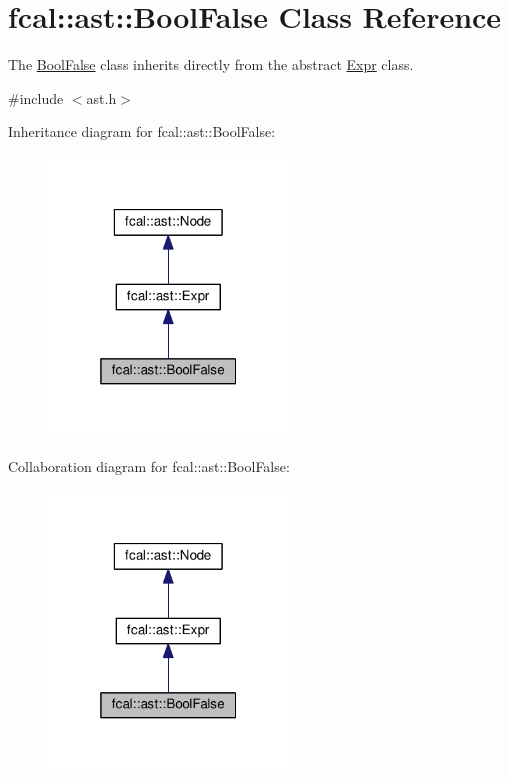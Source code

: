 \hypertarget{classfcal_1_1ast_1_1BoolFalse}{}\section{fcal\+:\+:ast\+:\+:Bool\+False Class Reference}
\label{classfcal_1_1ast_1_1BoolFalse}


The \hyperlink{classfcal_1_1ast_1_1BoolFalse}{Bool\+False} class inherits directly from the abstract \hyperlink{classfcal_1_1ast_1_1Expr}{Expr} class.  




{\ttfamily \#include $<$ast.\+h$>$}



Inheritance diagram for fcal\+:\+:ast\+:\+:Bool\+False\+:\nopagebreak
\begin{figure}[H]
\begin{center}
\leavevmode
\includegraphics[width=181pt]{classfcal_1_1ast_1_1BoolFalse__inherit__graph}
\end{center}
\end{figure}


Collaboration diagram for fcal\+:\+:ast\+:\+:Bool\+False\+:\nopagebreak
\begin{figure}[H]
\begin{center}
\leavevmode
\includegraphics[width=181pt]{classfcal_1_1ast_1_1BoolFalse__coll__graph}
\end{center}
\end{figure}
